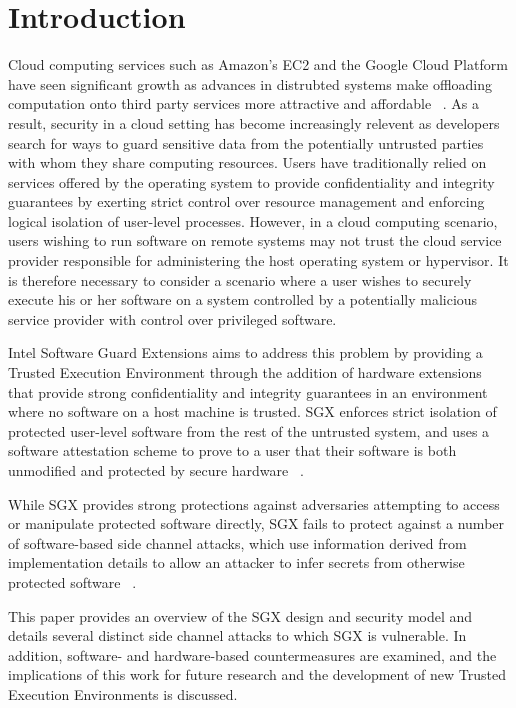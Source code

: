 \section{Introduction}

Cloud computing services such as Amazon's EC2 and the Google Cloud Platform have seen significant growth as advances in distrubted systems make offloading computation onto third party services more attractive and affordable ~\cite{lunden_amazons_2015}. As a result, security in a cloud setting has become increasingly relevent as developers search for ways to guard sensitive data from the potentially untrusted parties with whom they share computing resources. Users have traditionally relied on services offered by the operating system to provide confidentiality and integrity guarantees by exerting strict control over resource management and enforcing logical isolation of user-level processes. However, in a cloud computing scenario, users wishing to run software on remote systems may not trust the cloud service provider responsible for administering the host operating system or hypervisor. It is therefore necessary to consider a scenario where a user wishes to securely execute his or her software on a system controlled by a potentially malicious service provider with control over privileged software. 

Intel Software Guard Extensions aims to address this problem by providing a Trusted Execution Environment through the addition of hardware extensions that provide strong confidentiality and integrity guarantees in an environment where no software on a host machine is trusted. SGX enforces strict isolation of protected user-level software from the rest of the untrusted system, and uses a software attestation scheme to prove to a user that their software is both unmodified and protected by secure hardware ~\cite{intel_corporation_intel_2016}. 

While SGX provides strong protections against adversaries attempting to access or manipulate protected software directly, SGX fails to protect against a number of software-based side channel attacks, which use information derived from implementation details to allow an attacker to infer secrets from otherwise protected software ~\cite{costan_intel_2016}.

This paper provides an overview of the SGX design and security model and details several distinct side channel attacks to which SGX is vulnerable. In addition, software- and hardware-based countermeasures are examined, and the implications of this work for future research and the development of new Trusted Execution Environments is discussed.

